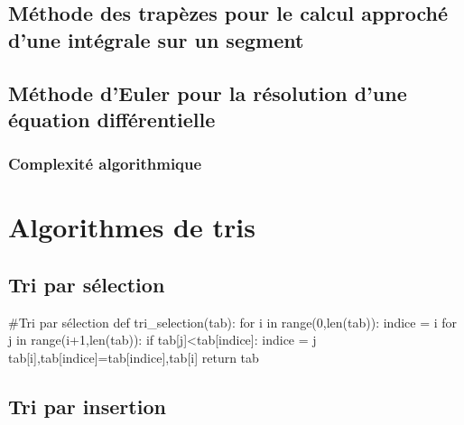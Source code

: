 \documentclass[10pt]{article}
\begin{document}
\subsection{Méthode des trapèzes pour le calcul approché d'une intégrale sur un segment}

\subsection{Méthode d'Euler pour la résolution d'une équation différentielle}
\subsubsection*{Complexité algorithmique}


\section{Algorithmes de tris}%
\subsection{Tri par sélection}
\begin{py}
\begin{python}
#Tri par sélection
def tri_selection(tab):
    for i in range(0,len(tab)):
        indice = i
        for j in range(i+1,len(tab)):
            if tab[j]<tab[indice]:
               indice = j
        tab[i],tab[indice]=tab[indice],tab[i]
    return tab
\end{python}
\end{py}
\subsection{Tri par insertion}
\end{document}
